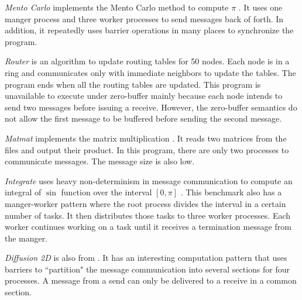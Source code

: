 \begin{compactitem}
\item \textit{Mento Carlo} implements the Mento Carlo method to compute $\pi$ \cite{}. It uses one manger process and three worker processes to send messages back of forth. In addition, it repeatedly uses barrier operations in many places to synchronize the program. 
\item \textit{Router} is an algorithm to update routing tables \cite{} for 50 nodes. Each node is in a ring and communicates only with immediate neighbors to update the tables. The program ends when all the routing tables are updated. This program is unavailable to execute under zero-buffer mainly because each node intends to send two messages before issuing a receive. However, the zero-buffer semantics do not allow the first message to be buffered before sending the second message.
\item \textit{Matmat} implements the matrix multiplication \cite{}. It reads two matrices from the files and output their product. In this program, there are only two processes to communicate messages. The message size is also low.
\item \textit{Integrate} uses heavy non-determinism in message communication to compute an integral of $\sin$ function over the interval $[0, \pi]$ \cite{}. This benchmark also has a manger-worker pattern where the root process divides the interval in a certain number of tasks. It then distributes those tasks to three worker processes. Each worker continues working on a task until it receives a termination message from the manger.
\item \textit{Diffusion 2D} is also from \cite{}. It has an interesting computation pattern that uses barriers to ``partition" the message communication into several sections for four processes. A message from a send can only be delivered to a receive in a common section. 

\end{compactitem}



